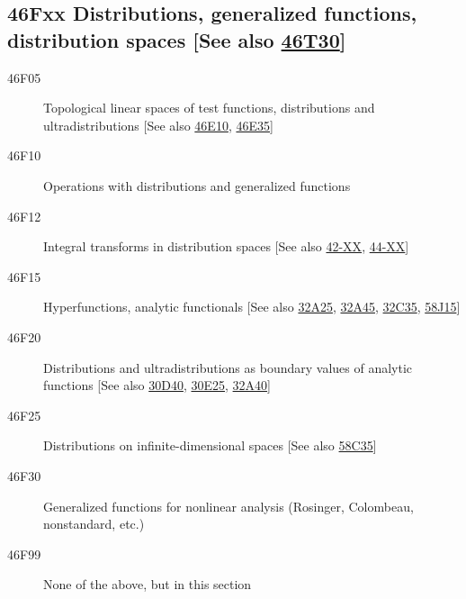 \subsection*{46Fxx  Distributions, generalized functions, distribution spaces [See also \hyperref[46T30]{46T30}] }\label{46Fxx}
\begin{description}  
\item [46F05]\label{46F05} Topological linear spaces of test functions, distributions and ultradistributions [See also \hyperref[46E10]{46E10}, \hyperref[46E35]{46E35}]
\item [46F10]\label{46F10} Operations with distributions and generalized functions
\item [46F12]\label{46F12} Integral transforms in distribution spaces [See also \hyperref[42-XX]{42-XX}, \hyperref[44-XX]{44-XX}]
\item [46F15]\label{46F15} Hyperfunctions, analytic functionals [See also \hyperref[32A25]{32A25}, \hyperref[32A45]{32A45}, \hyperref[32C35]{32C35}, \hyperref[58J15]{58J15}]
\item [46F20]\label{46F20} Distributions and ultradistributions as boundary values of analytic functions [See also \hyperref[30D40]{30D40}, \hyperref[30E25]{30E25}, \hyperref[32A40]{32A40}]
\item [46F25]\label{46F25} Distributions on infinite-dimensional spaces [See also \hyperref[58C35]{58C35}]
\item [46F30]\label{46F30} Generalized functions for nonlinear analysis (Rosinger, Colombeau, nonstandard, etc.)
\item [46F99]\label{46F99} None of the above, but in this section
\end{description}
